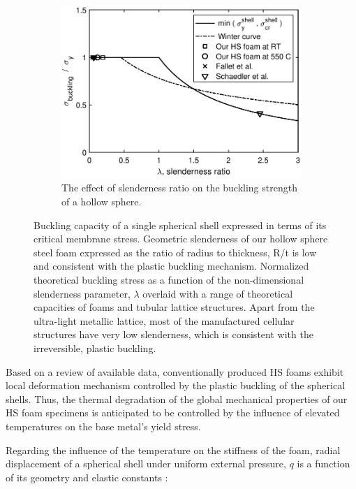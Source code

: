 \documentclass[review]{elsarticle}
\begin{document}
{\begin{figure}[htp]
	\par\bigskip %

	\begin{subfigure}{0.95\textwidth}
		\centering
		\includegraphics[width=0.65\linewidth]
		{Tex-Figures/Fig12b_Buckling_lambda.pdf}
		\caption{The effect of slenderness ratio on the buckling strength of a hollow sphere.}
		\label{fig12:sub2}
	\end{subfigure}
	\caption{Buckling capacity of a single spherical shell expressed in terms of its critical membrane stress. Geometric slenderness of our hollow sphere steel foam expressed as the ratio of radius to thickness, R/t is low and consistent with the plastic buckling mechanism. Normalized theoretical buckling stress as a function of the non-dimensional slenderness parameter, $\lambda$ overlaid with a range of theoretical capacities of foams and tubular lattice structures. Apart from the ultra-light metallic lattice, most of the manufactured cellular structures have very low slenderness, which is consistent with the irreversible, plastic buckling.}
\end{figure}


Based on a review of available data, conventionally produced HS foams exhibit local deformation mechanism controlled by the plastic buckling of the spherical shells. Thus, the thermal degradation of the global mechanical properties of our HS foam specimens is anticipated to be controlled by the influence of elevated temperatures on the base metal’s yield stress.

\FloatBarrier

Regarding the influence of the temperature on the stiffness of the foam, radial displacement of a spherical shell under uniform external pressure, $q$ is a function of its geometry and elastic constants \cite{TimGer2009}:

}
\end{document}
